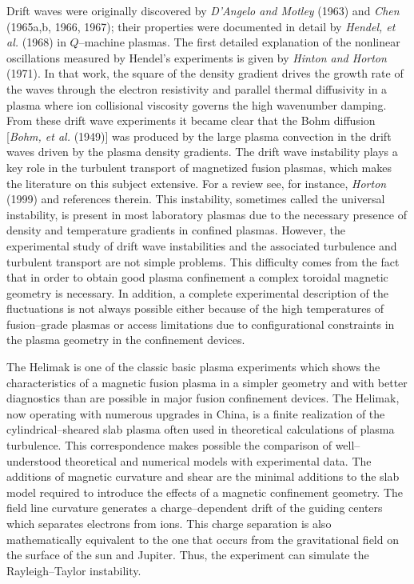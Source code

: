 \documentclass[a4paper,openany,12pt]{report}
\begin{document}
Drift waves were originally discovered by \emph{D'Angelo and Motley} (1963) and \emph{Chen} (1965a,b, 1966, 1967); their properties were documented in detail by \emph{Hendel, et al.} (1968) in 
$Q$--machine plasmas. The first detailed explanation of the nonlinear oscillations measured by Hendel's experiments is given by \emph{Hinton and Horton} (1971). In that work, the square of the density gradient drives the growth rate of the waves through the electron resistivity and parallel thermal diffusivity in a plasma where ion collisional viscosity governs the high wavenumber damping. From these drift wave experiments it became clear that the Bohm diffusion [\emph{Bohm, et al.} (1949)] was produced by the large plasma convection in the drift waves driven by the plasma density gradients. The drift wave instability plays a key role in the turbulent transport of magnetized fusion plasmas, which makes the literature on this subject extensive. For a review see, for instance, \emph{Horton} (1999) and references therein. This instability, sometimes called the universal instability, is present in most laboratory plasmas due to the necessary presence of density and temperature gradients in confined plasmas. However, the experimental study of drift wave instabilities and the associated turbulence and turbulent transport are not simple problems. This difficulty comes from the fact that in order to obtain good plasma confinement a complex toroidal magnetic geometry is necessary. In addition, a complete experimental description of the fluctuations is not always possible either because of the high temperatures of fusion--grade plasmas or access limitations due to configurational constraints in the plasma geometry in the confinement devices. 

The Helimak is one of the classic basic plasma experiments which shows the characteristics of a magnetic fusion plasma in a simpler geometry and with better diagnostics than are possible in major fusion confinement devices. The Helimak, now operating with numerous upgrades in China, is a finite realization of the cylindrical--sheared slab plasma often used in theoretical calculations of plasma turbulence. This correspondence makes possible the comparison of well--understood theoretical and numerical models with experimental data. The additions of magnetic curvature and shear are the minimal additions to the slab model required to introduce the effects of a magnetic confinement geometry. The field line curvature generates a charge--dependent drift of the guiding centers which separates electrons from ions. This charge separation is also mathematically equivalent to the one that occurs from the gravitational field on the surface of the sun and Jupiter. Thus, the experiment can simulate the Rayleigh--Taylor instability. 
\end{document}
